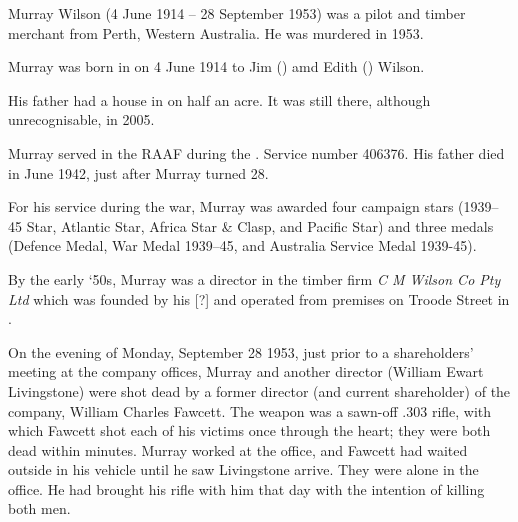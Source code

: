 
Murray Wilson (4 June 1914 -- 28 September 1953) was a pilot and timber merchant from Perth, Western Australia. He was murdered in 1953.

Murray was born in \cite{WABMD208} on 4 June 1914 to Jim () amd Edith () Wilson.

His father had a house in  on half an acre.  It was still there, although unrecognisable, in 2005.

Murray served in the RAAF during the . Service number 406376.\cite{NAAA9300} His father died in June 1942, just after Murray turned 28.

For his service during the war, Murray was awarded\cite{RMWDeptAirLetter} four campaign stars (1939--45 Star, Atlantic Star, Africa Star \& Clasp, and Pacific Star) and three medals (Defence Medal, War Medal 1939--45, and Australia Service Medal 1939-45).


By the early `50s, Murray was a director in the timber firm \emph{C M Wilson Co Pty Ltd} which was founded by his [?] and operated from premises on Troode Street in .\cite{CompanyChiefs}

On the evening of Monday, September 28 1953,\cite{WADeaths, WestAusDeathNotices, VictimEstate} just prior to a shareholders' meeting at the company offices, Murray and another director (William Ewart Livingstone) were shot dead by a former director\cite{InsanityVerdict} (and current shareholder) of the company, William Charles Fawcett.  The weapon was a sawn-off .303 rifle,\cite{GuiltyInsane, CompanyChiefs, TimberDirectors} with which Fawcett shot each of his victims once through the heart; they were both dead within minutes.\cite{CompanyChiefs}  Murray worked at the office, and Fawcett had waited outside in his vehicle until he saw Livingstone arrive.\cite{MurderDirectors} They were alone in the office.\cite{NewAngle} He had brought his rifle with him that day with the intention of killing both men.\cite{DoubleMurder}

